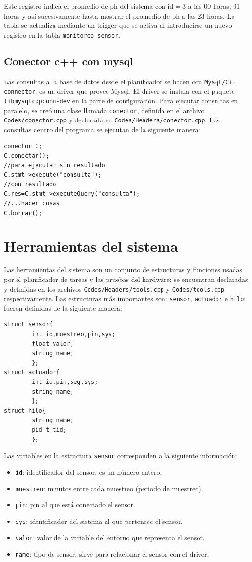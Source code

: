 \documentclass[a4paper,10pt,titlepage]{article}
\begin{document}
Este registro indica el promedio de ph del sistema con id$=3$ a las 00 horas, 01 horas y as\'i sucesivamente hasta mostrar el promedio de ph a las 23 horas. La tabla se 
actualiza mediante un trigger que se activa al introducirse un nuevo registro en la tabla \verb|monitoreo_sensor|. 

\subsection{Conector c++ con mysql}
Las consultas a la base de datos desde el planificador se hacen con \verb|Mysql/C++ connector|, es un driver que provee Mysql. El driver se instala con el paquete 
\verb|libmysqlcppconn-dev|
en la parte de configuraci\'on. Para ejecutar 
consultas en paralelo, se cre\'o una clase llamada \verb|conector|, definida en el archivo \verb|Codes/conector.cpp| y declarada en \verb|Codes/Headers/conector.cpp|. 
Las consultas dentro del programa se ejecutan de la siguiente manera:

\begin{verbatim}
conector C;
C.conectar();
//para ejecutar sin resultado
C.stmt->execute("consulta");
//con resultado
C.res=C.stmt->executeQuery("consulta");
//...hacer cosas
C.borrar();
\end{verbatim}


\section{Herramientas del sistema}
Las herramientas del sistema son un conjunto de estructuras y funciones usadas por el planificador de tareas y las pruebas del hardware; se 
encuentran declaradas y definidas en los 
archivos \verb|Codes/Headers/tools.cpp| y \verb|Codes/tools.cpp| respectivamente. Las estructuras m\'as importantes son: \verb|sensor|, 
\verb|actuador| e \verb|hilo|; fueron definidas de la siguiente manera:

\begin{verbatim}
struct sensor{
        int id,muestreo,pin,sys;
        float valor;
        string name;
        };
struct actuador{
        int id,pin,seg,sys;
        string name;
        };
struct hilo{
        string name;
        pid_t tid;
        };
\end{verbatim}
Las variables en la estructura \verb|sensor| corresponden a la siguiente informaci\'on: 

\begin{itemize}
  \item \verb|id|: identificador del sensor, es un n\'umero entero.
  \item \verb|muestreo|: minutos entre cada muestreo (periodo de muestreo). 
  \item \verb|pin|: pin al que est\'a conectado el sensor.
  \item \verb|sys|: identificador del sistema al que pertenece el sensor.
  \item \verb|valor|: valor de la variable del entorno que representa el sensor. 
  \item \verb|name|: tipo de sensor, sirve para relacionar el sensor con el driver. 
\end{itemize}
\end{document}
